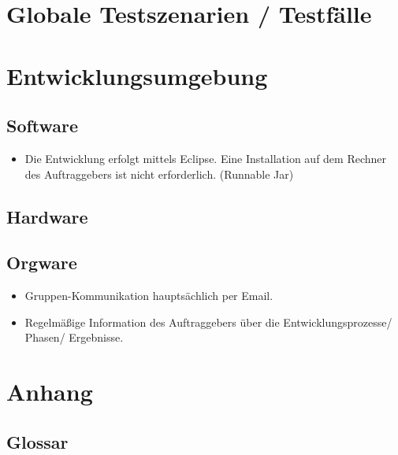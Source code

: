 \documentclass[10pt]{report}
\begin{document}
\chapter{Globale Testszenarien / Testfälle}

\chapter{Entwicklungsumgebung}
\section{Software}
\begin{itemize}
\item Die Entwicklung erfolgt mittels Eclipse. Eine Installation auf dem Rechner des Auftraggebers ist nicht erforderlich. (Runnable Jar)
\end{itemize}

\section{Hardware}

\section{Orgware}
\begin{itemize}
\item Gruppen-Kommunikation hauptsächlich per Email.
\item Regelmäßige Information des Auftraggebers über die Entwicklungsprozesse/ Phasen/ Ergebnisse.
\end{itemize}




\chapter{Anhang}
\section{Glossar}
\end{document}

